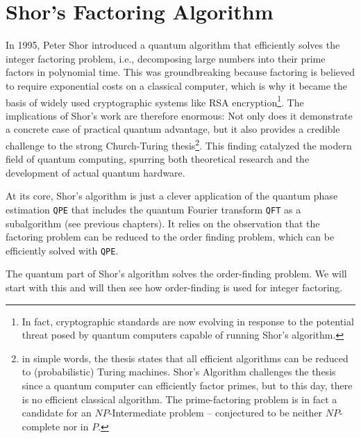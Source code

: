 \newcommand{\Mod}[1]{\ (\mathrm{mod}\ #1)}
\DeclarePairedDelimiter{\ceil}{\lceil}{\rceil}
\newcommand\scalemath[2]{\scalebox{#1}{\mbox{\ensuremath{\displaystyle #2}}}}

\section{Shor's Factoring Algorithm}

In 1995, Peter Shor introduced a quantum algorithm that efficiently solves the integer factoring problem, i.e., decomposing large numbers into their prime factors in polynomial time. This was groundbreaking because factoring is believed to require exponential costs on a classical computer, which is why it became the basis of widely used cryptographic systems like RSA encryption\footnote{In fact, cryptographic standards are now evolving in response to the potential threat posed by quantum computers capable of running Shor’s algorithm.}. The implications of Shor's work are therefore enormous: Not only does it demonstrate a concrete case of practical quantum advantage, but it also provides a credible challenge to the strong Church-Turing thesis\footnote{in simple words, the thesis states that all efficient algorithms can be reduced to (probabilistic) Turing machines. Shor's Algorithm challenges the thesis since a quantum computer can efficiently factor primes, but to this day, there is no efficient classical algorithm. The prime-factoring problem is in fact a candidate for an $NP$-Intermediate problem -- conjectured to be neither $NP$-complete nor in $P$.}. This finding catalyzed the modern field of quantum computing, spurring both theoretical research and the development of actual quantum hardware. 

At its core, Shor’s algorithm is just a clever application of the quantum phase estimation \texttt{QPE} that includes the quantum Fourier transform \texttt{QFT} as a subalgorithm (see previous chapters). It relies on the observation that the factoring problem can be reduced to the order finding problem, which can be efficiently solved with \texttt{QPE}.

The quantum part of Shor's algorithm solves the order-finding problem. We will start with this and will then see how order-finding is used for integer factoring.

